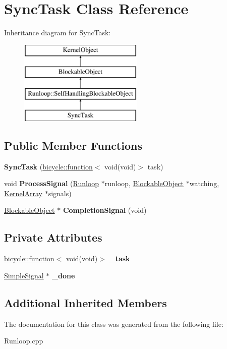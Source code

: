 \hypertarget{class_sync_task}{}\section{Sync\+Task Class Reference}
\label{class_sync_task}
Inheritance diagram for Sync\+Task\+:\begin{figure}[H]
\begin{center}
\leavevmode
\includegraphics[height=4.000000cm]{class_sync_task}
\end{center}
\end{figure}
\subsection*{Public Member Functions}
\begin{DoxyCompactItemize}
\item 
\mbox{\label{class_sync_task_a4ebaa9f00d21975f32bc361153ad3b9a}} 
{\bfseries Sync\+Task} (\hyperlink{classbicycle_1_1function}{bicycle\+::function}$<$ void(void)$>$ task)
\item 
\mbox{\label{class_sync_task_a78ec6da988e193eb4a2038178b128612}} 
void {\bfseries Process\+Signal} (\hyperlink{class_runloop}{Runloop} $\ast$runloop, \hyperlink{class_blockable_object}{Blockable\+Object} $\ast$watching, \hyperlink{class_kernel_array}{Kernel\+Array} $\ast$signals)
\item 
\mbox{\label{class_sync_task_a687179d08a06cbc15e80b9922afc2b0a}} 
\hyperlink{class_blockable_object}{Blockable\+Object} $\ast$ {\bfseries Completion\+Signal} (void)
\end{DoxyCompactItemize}
\subsection*{Private Attributes}
\begin{DoxyCompactItemize}
\item 
\mbox{\label{class_sync_task_ab172fb435e6caefb7f309a4e6338a477}} 
\hyperlink{classbicycle_1_1function}{bicycle\+::function}$<$ void(void)$>$ {\bfseries \+\_\+task}
\item 
\mbox{\label{class_sync_task_a339bc4969c5a21562b6dcd9f7451bb06}} 
\hyperlink{class_simple_signal}{Simple\+Signal} $\ast$ {\bfseries \+\_\+done}
\end{DoxyCompactItemize}
\subsection*{Additional Inherited Members}


The documentation for this class was generated from the following file\+:\begin{DoxyCompactItemize}
\item 
Runloop.\+cpp\end{DoxyCompactItemize}
